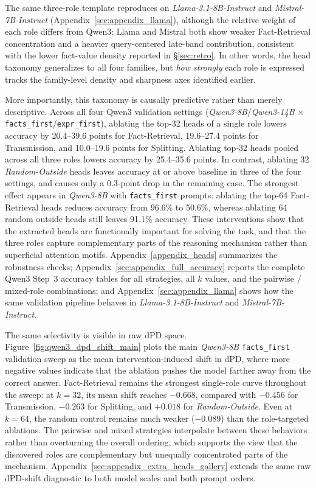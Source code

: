 \documentclass[11pt]{article}
\begin{document}
The same three-role template reproduces on \textit{Llama-3.1-8B-Instruct} and \textit{Mistral-7B-Instruct} (Appendix~\ref{sec:appendix_llama}), although the relative weight of each role differs from Qwen3: Llama and Mistral both show weaker Fact-Retrieval concentration and a heavier query-centered late-band contribution, consistent with the lower fact-value density reported in §\ref{sec:retro}. In other words, the head taxonomy generalizes to all four families, but \emph{how strongly} each role is expressed tracks the family-level density and sharpness axes identified earlier.

More importantly, this taxonomy is causally predictive rather than merely descriptive. Across all four Qwen3 validation settings (\textit{Qwen3-8B}/\textit{Qwen3-14B} $\times$ \texttt{facts\_first}/\texttt{expr\_first}), ablating the top-32 heads of a single role lowers accuracy by 20.4--39.6 points for Fact-Retrieval, 19.6--27.4 points for Transmission, and 10.0--19.6 points for Splitting. Ablating top-32 heads pooled across all three roles lowers accuracy by 25.4--35.6 points. In contrast, ablating 32 \textit{Random-Outside} heads leaves accuracy at or above baseline in three of the four settings, and causes only a 0.3-point drop in the remaining case. The strongest effect appears in \textit{Qwen3-8B} with \texttt{facts\_first} prompts: ablating the top-64 Fact-Retrieval heads reduces accuracy from 96.6\% to 50.6\%, whereas ablating 64 random outside heads still leaves 91.1\% accuracy. These interventions show that the extracted heads are functionally important for solving the task, and that the three roles capture complementary parts of the reasoning mechanism rather than superficial attention motifs. Appendix~\ref{appendix_heads} summarizes the robustness checks; Appendix~\ref{sec:appendix_full_accuracy} reports the complete Qwen3 Step~3 accuracy tables for all strategies, all $k$ values, and the pairwise / mixed-role combinations; and Appendix~\ref{sec:appendix_llama} shows how the same validation pipeline behaves in \textit{Llama-3.1-8B-Instruct} and \textit{Mistral-7B-Instruct}.

The same selectivity is visible in raw dPD space. Figure~\ref{fig:qwen3_dpd_shift_main} plots the main \textit{Qwen3-8B} \texttt{facts\_first} validation sweep as the mean intervention-induced shift in dPD, where more negative values indicate that the ablation pushes the model farther away from the correct answer. Fact-Retrieval remains the strongest single-role curve throughout the sweep: at $k=32$, its mean shift reaches $-0.668$, compared with $-0.456$ for Transmission, $-0.263$ for Splitting, and $+0.018$ for \textit{Random-Outside}. Even at $k=64$, the random control remains much weaker ($-0.089$) than the role-targeted ablations. The pairwise and mixed strategies interpolate between these behaviors rather than overturning the overall ordering, which supports the view that the discovered roles are complementary but unequally concentrated parts of the mechanism. Appendix~\ref{sec:appendix_extra_heads_gallery} extends the same raw dPD-shift diagnostic to both model scales and both prompt orders.
\end{document}
